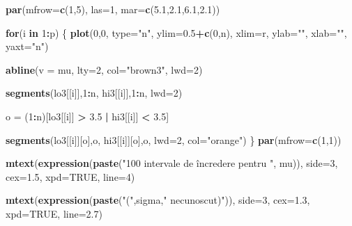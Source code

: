 \documentclass[]{article}
\newenvironment{Shaded}{\begin{snugshade}}{\end{snugshade}}
\newcommand{\KeywordTok}[1]{\textcolor[rgb]{0.13,0.29,0.53}{\textbf{#1}}}
\newcommand{\DataTypeTok}[1]{\textcolor[rgb]{0.13,0.29,0.53}{#1}}
\newcommand{\DecValTok}[1]{\textcolor[rgb]{0.00,0.00,0.81}{#1}}
\newcommand{\FloatTok}[1]{\textcolor[rgb]{0.00,0.00,0.81}{#1}}
\newcommand{\StringTok}[1]{\textcolor[rgb]{0.31,0.60,0.02}{#1}}
\newcommand{\OtherTok}[1]{\textcolor[rgb]{0.56,0.35,0.01}{#1}}
\newcommand{\ControlFlowTok}[1]{\textcolor[rgb]{0.13,0.29,0.53}{\textbf{#1}}}
\newcommand{\OperatorTok}[1]{\textcolor[rgb]{0.81,0.36,0.00}{\textbf{#1}}}
\newcommand{\NormalTok}[1]{#1}
\begin{document}
\begin{Shaded}
\begin{Highlighting}[]
\KeywordTok{par}\NormalTok{(}\DataTypeTok{mfrow=}\KeywordTok{c}\NormalTok{(}\DecValTok{1}\NormalTok{,}\DecValTok{5}\NormalTok{), }\DataTypeTok{las=}\DecValTok{1}\NormalTok{, }\DataTypeTok{mar=}\KeywordTok{c}\NormalTok{(}\FloatTok{5.1}\NormalTok{,}\FloatTok{2.1}\NormalTok{,}\FloatTok{6.1}\NormalTok{,}\FloatTok{2.1}\NormalTok{))}

\ControlFlowTok{for}\NormalTok{(i }\ControlFlowTok{in} \DecValTok{1}\OperatorTok{:}\NormalTok{p) \{}
  \KeywordTok{plot}\NormalTok{(}\DecValTok{0}\NormalTok{,}\DecValTok{0}\NormalTok{,}
       \DataTypeTok{type=}\StringTok{"n"}\NormalTok{,}
       \DataTypeTok{ylim=}\FloatTok{0.5}\OperatorTok{+}\KeywordTok{c}\NormalTok{(}\DecValTok{0}\NormalTok{,n),}
       \DataTypeTok{xlim=}\NormalTok{r,}
       \DataTypeTok{ylab=}\StringTok{""}\NormalTok{,}
       \DataTypeTok{xlab=}\StringTok{""}\NormalTok{,}
       \DataTypeTok{yaxt=}\StringTok{"n"}\NormalTok{)}
  
  \KeywordTok{abline}\NormalTok{(}\DataTypeTok{v =}\NormalTok{ mu, }\DataTypeTok{lty=}\DecValTok{2}\NormalTok{, }\DataTypeTok{col=}\StringTok{"brown3"}\NormalTok{, }\DataTypeTok{lwd=}\DecValTok{2}\NormalTok{)}
  
  \KeywordTok{segments}\NormalTok{(lo3[[i]],}\DecValTok{1}\OperatorTok{:}\NormalTok{n,}
\NormalTok{           hi3[[i]],}\DecValTok{1}\OperatorTok{:}\NormalTok{n,}
           \DataTypeTok{lwd=}\DecValTok{2}\NormalTok{)}
  
\NormalTok{  o =}\StringTok{ }\NormalTok{(}\DecValTok{1}\OperatorTok{:}\NormalTok{n)[lo3[[i]] }\OperatorTok{>}\StringTok{ }\FloatTok{3.5} \OperatorTok{|}\StringTok{ }\NormalTok{hi3[[i]] }\OperatorTok{<}\StringTok{ }\FloatTok{3.5}\NormalTok{]}
  
  \KeywordTok{segments}\NormalTok{(lo3[[i]][o],o,}
\NormalTok{           hi3[[i]][o],o,}
           \DataTypeTok{lwd=}\DecValTok{2}\NormalTok{, }\DataTypeTok{col=}\StringTok{"orange"}\NormalTok{)}
\NormalTok{\}}
\KeywordTok{par}\NormalTok{(}\DataTypeTok{mfrow=}\KeywordTok{c}\NormalTok{(}\DecValTok{1}\NormalTok{,}\DecValTok{1}\NormalTok{))}

\KeywordTok{mtext}\NormalTok{(}\KeywordTok{expression}\NormalTok{(}\KeywordTok{paste}\NormalTok{(}\StringTok{"100 intervale de încredere pentru "}\NormalTok{, mu)),}
      \DataTypeTok{side=}\DecValTok{3}\NormalTok{, }\DataTypeTok{cex=}\FloatTok{1.5}\NormalTok{, }\DataTypeTok{xpd=}\OtherTok{TRUE}\NormalTok{, }\DataTypeTok{line=}\DecValTok{4}\NormalTok{)}

\KeywordTok{mtext}\NormalTok{(}\KeywordTok{expression}\NormalTok{(}\KeywordTok{paste}\NormalTok{(}\StringTok{"("}\NormalTok{,sigma,}\StringTok{" necunoscut)"}\NormalTok{)),}
      \DataTypeTok{side=}\DecValTok{3}\NormalTok{, }\DataTypeTok{cex=}\FloatTok{1.3}\NormalTok{, }\DataTypeTok{xpd=}\OtherTok{TRUE}\NormalTok{, }\DataTypeTok{line=}\FloatTok{2.7}\NormalTok{)}
\end{Highlighting}
\end{Shaded}
\end{document}
